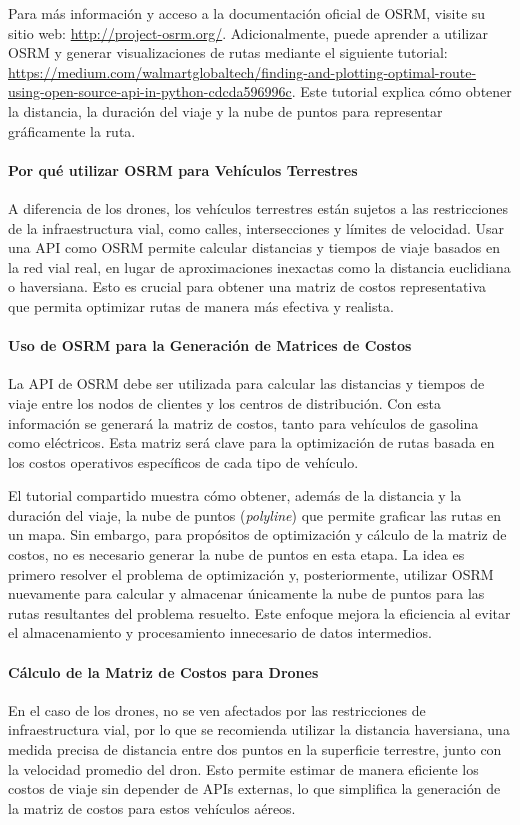 \documentclass[12pt]{article}
\begin{document}
Para más información y acceso a la documentación oficial de OSRM, visite su sitio web: \url{http://project-osrm.org/}. Adicionalmente, puede aprender a utilizar OSRM y generar visualizaciones de rutas mediante el siguiente tutorial: \url{https://medium.com/walmartglobaltech/finding-and-plotting-optimal-route-using-open-source-api-in-python-cdcda596996c}. Este tutorial explica cómo obtener la distancia, la duración del viaje y la nube de puntos para representar gráficamente la ruta.

\paragraph{Por qué utilizar OSRM para Vehículos Terrestres}
A diferencia de los drones, los vehículos terrestres están sujetos a las restricciones de la infraestructura vial, como calles, intersecciones y límites de velocidad. Usar una API como OSRM permite calcular distancias y tiempos de viaje basados en la red vial real, en lugar de aproximaciones inexactas como la distancia euclidiana o haversiana. Esto es crucial para obtener una matriz de costos representativa que permita optimizar rutas de manera más efectiva y realista.

\paragraph{Uso de OSRM para la Generación de Matrices de Costos}
La API de OSRM debe ser utilizada para calcular las distancias y tiempos de viaje entre los nodos de clientes y los centros de distribución. Con esta información se generará la matriz de costos, tanto para vehículos de gasolina como eléctricos. Esta matriz será clave para la optimización de rutas basada en los costos operativos específicos de cada tipo de vehículo.

El tutorial compartido muestra cómo obtener, además de la distancia y la duración del viaje, la nube de puntos (\textit{polyline}) que permite graficar las rutas en un mapa. Sin embargo, para propósitos de optimización y cálculo de la matriz de costos, no es necesario generar la nube de puntos en esta etapa. La idea es primero resolver el problema de optimización y, posteriormente, utilizar OSRM nuevamente para calcular y almacenar únicamente la nube de puntos para las rutas resultantes del problema resuelto. Este enfoque mejora la eficiencia al evitar el almacenamiento y procesamiento innecesario de datos intermedios.

\paragraph{Cálculo de la Matriz de Costos para Drones}
En el caso de los drones, no se ven afectados por las restricciones de infraestructura vial, por lo que se recomienda utilizar la distancia haversiana, una medida precisa de distancia entre dos puntos en la superficie terrestre, junto con la velocidad promedio del dron. Esto permite estimar de manera eficiente los costos de viaje sin depender de APIs externas, lo que simplifica la generación de la matriz de costos para estos vehículos aéreos.
\end{document}
